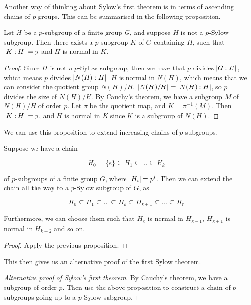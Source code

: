 \documentclass{article}
\begin{document}
    Another way of thinking about Sylow's first theorem is in terms of ascending chains of $p$-groups. This can be summarised in the following proposition.

    \begin{proposition*}
        Let $H$ be a $p$-subgroup of a finite group $G$, and suppose $H$ is not a $p$-Sylow subgroup. Then there exists a $p$ subgroup $K$ of $G$ containing $H$, such that $\abs{K : H} = p$ and $H$ is normal in $K$. 
    \end{proposition*}

    \begin{proof}
        Since $H$ is not a $p$-Sylow subgroup, then we have that $p$ divides $\abs{G : H}$, which means $p$ divides $\abs{N(H) : H}$. $H$ is normal in $N(H)$, which means that we can consider the quotient group $N(H) / H$. $\abs{N(H) / H} = \abs{N(H) : H}$, so $p$ divides the size of $N(H) / H$. By Cauchy's theorem, we have a subgroup $M$ of $N(H) / H$ of order $p$. Let $\pi$ be the quotient map, and $K = \pi^{-1}(M)$. Then $\abs{K : H} = p$, and $H$ is normal in $K$ since $K$ is a subgroup of $N(H)$.
    \end{proof}

    We can use this proposition to extend increasing chains of $p$-subgroups.

    \begin{proposition*}
        Suppose we have a chain

        $$H_0 = \{e\} \subseteq H_1 \subseteq \dots \subseteq H_k$$

        of $p$-subgroups of a finite group $G$, where $\abs{H_i} = p^i$. Then we can extend the chain all the way to a $p$-Sylow subgroup of $G$, as

        $$H_0 \subseteq H_1 \subseteq \dots \subseteq H_k \subseteq H_{k+1} \subseteq \dots \subseteq H_r$$

        Furthermore, we can choose them such that $H_k$ is normal in $H_{k+1}$, $H_{k+1}$ is normal in $H_{k+2}$ and so on.
    \end{proposition*}

    \begin{proof}
        Apply the previous proposition.
    \end{proof}

    This then gives us an alternative proof of the first Sylow theorem.

    \begin{proof}
        [Alternative proof of Sylow's first theorem] By Cauchy's theorem, we have a subgroup of order $p$. Then use the above proposition to construct a chain of $p$-subgroups going up to a $p$-Sylow subgroup.
    \end{proof}
\end{document}
